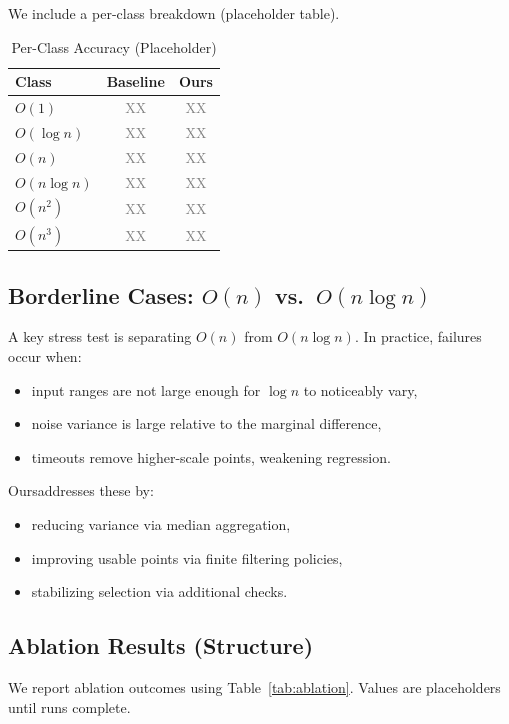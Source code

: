 \documentclass[conference]{IEEEtran}
\newcommand{\ours}{Ours}
\newcommand{\baseline}{Baseline}
\newcommand{\placeholder}{\textcolor{gray}{XX}}
\begin{document}
We include a per-class breakdown (placeholder table).

\begin{table}[t]
\centering
\caption{Per-Class Accuracy (Placeholder)}
\label{tab:perclass}
\begin{tabular}{lcc}
\toprule
Class & \baseline & \ours \\
\midrule
$O(1)$ & \placeholder & \placeholder \\
$O(\log n)$ & \placeholder & \placeholder \\
$O(n)$ & \placeholder & \placeholder \\
$O(n\log n)$ & \placeholder & \placeholder \\
$O(n^2)$ & \placeholder & \placeholder \\
$O(n^3)$ & \placeholder & \placeholder \\
\bottomrule
\end{tabular}
\end{table}

\subsection{Borderline Cases: $O(n)$ vs.\ $O(n\log n)$}

A key stress test is separating $O(n)$ from $O(n\log n)$.
In practice, failures occur when:
\begin{itemize}[leftmargin=1.2em]
\item input ranges are not large enough for $\log n$ to noticeably vary,
\item noise variance is large relative to the marginal difference,
\item timeouts remove higher-scale points, weakening regression.
\end{itemize}

\ours addresses these by:
\begin{itemize}[leftmargin=1.2em]
\item reducing variance via median aggregation,
\item improving usable points via finite filtering policies,
\item stabilizing selection via additional checks.
\end{itemize}

\subsection{Ablation Results (Structure)}

We report ablation outcomes using Table~\ref{tab:ablation}.
Values are placeholders until runs complete.
\end{document}
